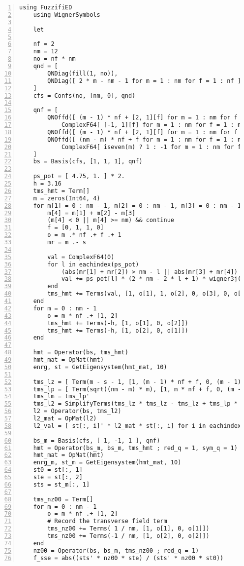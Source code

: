 \documentclass{timesjhep}
\begin{document}
\begin{lstlisting}[numbers=left]
    using FuzzifiED
    using WignerSymbols

    let

    nf = 2
    nm = 12
    no = nf * nm
    qnd = [ 
        QNDiag(fill(1, no)), 
        QNDiag([ 2 * m - nm - 1 for m = 1 : nm for f = 1 : nf ])
    ]
    cfs = Confs(no, [nm, 0], qnd)

    qnf = [
        QNOffd([ (m - 1) * nf + [2, 1][f] for m = 1 : nm for f = 1 : nf ], true, 
            ComplexF64[ [-1, 1][f] for m = 1 : nm for f = 1 : nf ]),
        QNOffd([ (m - 1) * nf + [2, 1][f] for m = 1 : nm for f = 1 : nf ]),
        QNOffd([ (nm - m) * nf + f for m = 1 : nm for f = 1 : nf], 
            ComplexF64[ iseven(m) ? 1 : -1 for m = 1 : nm for f = 1 : nf ])
    ]
    bs = Basis(cfs, [1, 1, 1], qnf) 

    ps_pot = [ 4.75, 1. ] * 2.
    h = 3.16
    tms_hmt = Term[]
    m = zeros(Int64, 4)
    for m[1] = 0 : nm - 1, m[2] = 0 : nm - 1, m[3] = 0 : nm - 1
        m[4] = m[1] + m[2] - m[3]
        (m[4] < 0 || m[4] >= nm) && continue
        f = [0, 1, 1, 0]
        o = m .* nf .+ f .+ 1
        mr = m .- s
        
        val = ComplexF64(0)
        for l in eachindex(ps_pot)
            (abs(mr[1] + mr[2]) > nm - l || abs(mr[3] + mr[4]) > nm - l) && break 
            val += ps_pot[l] * (2 * nm - 2 * l + 1) * wigner3j(s, s, nm - l, mr[1], mr[2], -mr[1] - mr[2]) * wigner3j(s, s, nm - l, mr[4], mr[3], -mr[3] - mr[4])
        end 
        tms_hmt += Terms(val, [1, o[1], 1, o[2], 0, o[3], 0, o[4]])    
    end 
    for m = 0 : nm - 1
        o = m * nf .+ [1, 2]
        tms_hmt += Terms(-h, [1, o[1], 0, o[2]])
        tms_hmt += Terms(-h, [1, o[2], 0, o[1]])
    end

    hmt = Operator(bs, tms_hmt)
    hmt_mat = OpMat(hmt)
    enrg, st = GetEigensystem(hmt_mat, 10)

    tms_lz = [ Term(m - s - 1, [1, (m - 1) * nf + f, 0, (m - 1) * nf + f]) for m = 1 : nm for f = 1 : nf ]
    tms_lp = [ Term(sqrt((nm - m) * m), [1, m * nf + f, 0, (m - 1) * nf + f]) for m = 1 : nm - 1 for f = 1 : nf ]
    tms_lm = tms_lp' 
    tms_l2 = SimplifyTerms(tms_lz * tms_lz - tms_lz + tms_lp * tms_lm)
    l2 = Operator(bs, tms_l2)
    l2_mat = OpMat(l2)
    l2_val = [ st[:, i]' * l2_mat * st[:, i] for i in eachindex(enrg)]

    bs_m = Basis(cfs, [ 1, -1, 1 ], qnf) 
    hmt = Operator(bs_m, bs_m, tms_hmt ; red_q = 1, sym_q = 1) 
    hmt_mat = OpMat(hmt)
    enrg_m, st_m = GetEigensystem(hmt_mat, 10)
    st0 = st[:, 1] 
    ste = st[:, 2] 
    sts = st_m[:, 1]

    tms_nz00 = Term[]
    for m = 0 : nm - 1
        o = m * nf .+ [1, 2]
        # Record the transverse field term
        tms_nz00 += Terms( 1 / nm, [1, o[1], 0, o[1]])
        tms_nz00 += Terms(-1 / nm, [1, o[2], 0, o[2]])
    end
    nz00 = Operator(bs, bs_m, tms_nz00 ; red_q = 1)
    f_sse = abs((sts' * nz00 * ste) / (sts' * nz00 * st0))
\end{lstlisting}
\end{document}
